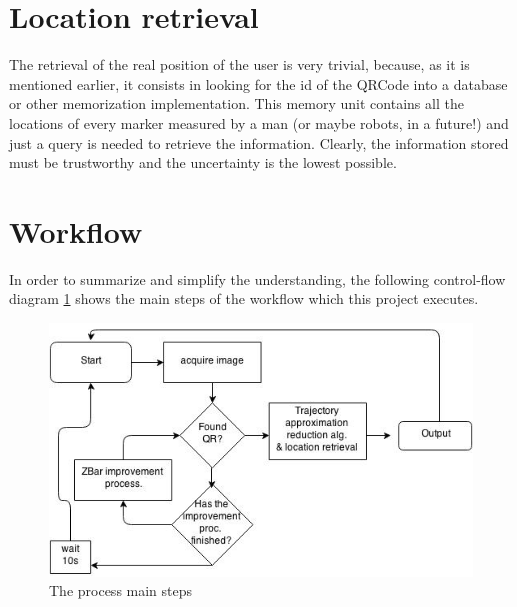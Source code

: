 \section{Location retrieval}
The retrieval of the real position of the user is very trivial, because, as it is mentioned earlier, it consists in looking for the id of the QRCode into a database or other memorization implementation.
This memory unit contains all the locations of every marker measured by a man (or maybe robots, in a future!) and just a query is needed to retrieve the information.
Clearly, the information stored must be trustworthy and the uncertainty is the lowest possible.

\section{Workflow}
In order to summarize and simplify the understanding, the following control-flow diagram \ref{workflow} shows the main steps of the workflow which this project executes.
\begin{figure}[hbt]
    \centering
    \includegraphics[scale=0.8]{img/workflow.jpg}
    \caption{The process main steps \label{workflow}}
\end{figure}

